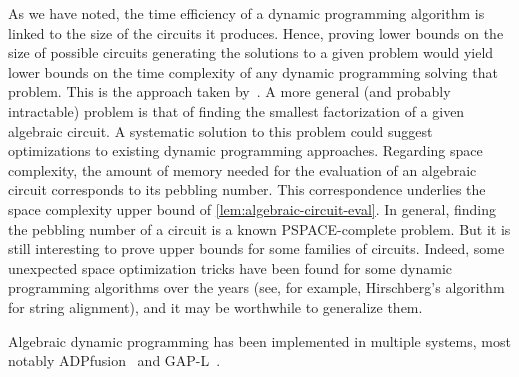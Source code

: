 As we have noted, the time efficiency of a dynamic programming algorithm is linked to the size of the circuits it produces.
Hence, proving lower bounds on the size of possible circuits generating the solutions to a given problem would yield lower bounds on the time complexity of any dynamic programming solving that problem.
This is the approach taken by~\textcite{Jukna2015LowerBoundsTropical}.
A more general (and probably intractable) problem is that of finding the smallest factorization of a given algebraic circuit.
A systematic solution to this problem could suggest optimizations to existing dynamic programming approaches.
Regarding space complexity, the amount of memory needed for the evaluation of an algebraic circuit corresponds to its pebbling number.
This correspondence underlies the space complexity upper bound of \cref{lem:algebraic-circuit-eval}.
In general, finding the pebbling number of a circuit is a known PSPACE-complete problem.
But it is still interesting to prove upper bounds for some families of circuits.
Indeed, some unexpected space optimization tricks have been found for some dynamic programming algorithms over the years (see, for example, Hirschberg’s algorithm for string alignment), and it may be worthwhile to generalize them.

Algebraic dynamic programming has been implemented in multiple systems, most notably 
ADPfusion~\parencite{Siederdissen2012SneakingConcatmap}
and GAP-L~\parencite{Sauthoff2013BellmansGapLanguage}.






